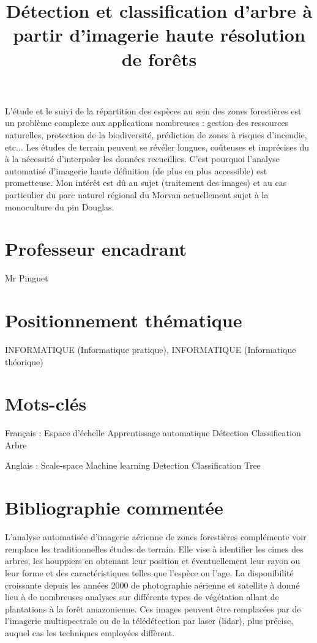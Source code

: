 \documentclass{article}
\title{Détection et classification d'arbre à partir d'imagerie haute résolution de forêts}
\begin{document}
\maketitle

L'étude et le suivi de la répartition des espèces au sein des zones forestières est un problème complexe aux applications nombreuses : gestion des ressources naturelles, protection de la biodiversité, prédiction de zones à risques d'incendie, etc... 
Les études de terrain peuvent se révéler longues, coûteuses et imprécises du à la nécessité d'interpoler les données recueillies. 
C'est pourquoi l'analyse automatisé d'imagerie haute définition (de plus en plus accessible) est prometteuse.
Mon intérêt est dû au sujet (traitement des images) et au cas particulier du parc naturel régional du Morvan actuellement sujet à la monoculture du pin Douglas.

\section{Professeur encadrant}
Mr Pinguet

\section{Positionnement thématique}
INFORMATIQUE (Informatique pratique), INFORMATIQUE (Informatique théorique)

\section{Mots-clés}
Français :
Espace d'échelle
Apprentissage automatique 
Détection
Classification 
Arbre

Anglais :
Scale-space
Machine learning
Detection
Classification
Tree

\section{Bibliographie commentée}

L'analyse automatisée d'imagerie aérienne de zones forestières complémente voir remplace les traditionnelles études de terrain. Elle vise à identifier les cimes des arbres, les houppiers en obtenant leur position et éventuellement leur rayon ou leur forme et des caractéristiques telles que l'espèce ou l'age. La disponibilité croissante depuis les années 2000 de photographie aérienne et satellite à donné lieu à de nombreuses analyses sur différents types de végétation allant de plantations à la forêt amazonienne. Ces images peuvent être remplacées par de l'imagerie multispectrale ou de la télédétection par laser (lidar), plus précise, auquel cas les techniques employées diffèrent.
\end{document}
